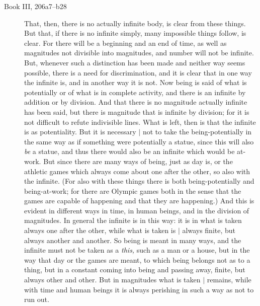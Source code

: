 \documentclass[twoside,openright]{article}
\begin{document}
\begin{description}

\item[Book III, 206a7--b28] That, then, there is no actually infinite
  body, is clear from these things.  But that, if there is no infinite
  simply, many impossible things follow, is clear.  For there will be
  a beginning and an end of time, as well as magnitudes not divisible
  into magnitudes, and number will not be infinite.  But, whenever
  such a distinction has been made and neither way seems possible,
  there is a need for discrimination, and it is clear that in one way
  the infinite is, and in another way it is not.  Now being is said of
  what is potentially or of what is in complete activity, and there is
  an infinite by addition or by division.  And that there is no
  magnitude actually infinite has been said, but there is magnitude
  that is infinite by division; for it is not difficult to refute
  indivisible lines.  What is left, then is that the infinite is as
  potentiality.  But it is necessary $|$ not to
  take the being-potentially in the same way as if something were
  potentially a statue, since this will also \emph{be} a statue, and
  thus there would also be an infinite which would be at-work.  But
  since there are many ways of being, just as day is, or the athletic
  games which always come about one after the other, so also with the
  infinite. (For also with these things there is both
  being-potentially and being-at-work; for there are Olympic games
  both in the sense that the games are capable of happening and that
  they are happening.)  And this is evident in different ways in time,
  in human beings, and in the division of magnitudes. In general the
  infinite is in this way: it is in what is taken always one after the
  other, while what is taken is $|$ always finite,
  but always another and another.  So being is meant in many ways, and
  the infinite must not be taken as a \emph{this,} such as a man or a
  house, but in the way that day or the games are meant, to which
  being belongs not as to a thing, but in a constant coming into being
  and passing away, finite, but always other and other.  But in
  magnitudes what is taken $|$ remains, while with
  time and human beings it is always perishing in such a way as not to
  run out.


\end{description}
\end{document}
